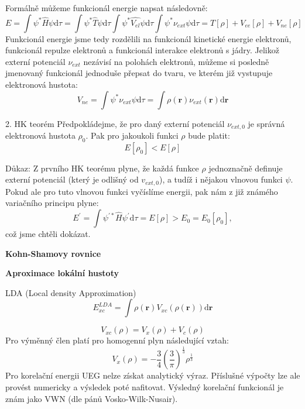 Formálně můžeme funkcionál energie napsat následovně:
\begin{equation}
E=\int \psi^*\hat{H}\psi \mathrm{d}\tau = \int \psi^*\hat{T}\psi\mathrm{d}\tau \int \psi^*\hat{V_{el}}\psi\mathrm{d}\tau \int \psi^*\nu_{ext}\psi\mathrm{d}\tau=T[\rho]+V_{ee}[\rho]+V_{ne}[\rho]
\end{equation}
Funkcionál energie jsme tedy rozdělili na funkcionál kinetické energie elektronů, funkcionál repulze elektronů a funkcionál interakce elektronů s jádry. Jelikož externí potenciál $\nu_{ext}$ nezávisí na polohách elektronů, můžeme si posledně jmenovaný funkcionál jednoduše přepsat do tvaru, ve kterém již vystupuje elektronová hustota:
\begin{equation}
V_{ne}=\int \psi^*\nu_{ext}\psi\mathrm{d}\tau = \int \rho(\textbf{r})\nu_{ext}(\textbf{r}) \mathrm{d}\textbf{r} 
\end{equation} 


2. HK teorém 
Předpokládejme, že pro daný externí potenciál $\nu_{ext,0}$ je správná elektronová hustota $\rho_0$. Pak pro jakoukoli funkci $\rho$ bude platit: $$ E[\rho_0] < E[\rho] $$

Důkaz:
Z prvního HK teorému plyne, že každá funkce $\rho$ jednoznačně definuje externí potenciál (který je odlišný od $v_{ext,0}$), a tudíž i nějakou vlnovou funkci $\psi$. Pokud ale pro tuto vlnovou funkci vyčíslíme energii, pak nám z již známého variačního principu plyne:
\begin{equation}
E^\prime=\int \psi^{\prime *} \hat{H} \psi^{\prime} \mathrm{d}\tau = E[\rho] > E_0 = E_0 [\rho_0] ,
\end{equation}
což jsme chtěli dokázat.

\textbf{Kohn-Shamovy rovnice}


\textbf{Aproximace lokální hustoty}

LDA (Local density Approximation)
\begin{equation}
E_{xc}^{LDA}=\int \rho(\textbf{r})V_{xc}(\rho(\textbf{r}))\mathrm{d}\textbf{r} 
\end{equation}


\begin{equation}
V_{xc}(\rho)=V_x(\rho)+V_c(\rho)
\end{equation}
Pro výměnný člen platí pro homogenní plyn následující vztah:
\begin{equation}
V_x(\rho)=-\frac{3}{4}\left(\frac{3}{\pi}\right)^{\frac{1}{3}}\rho^{\frac{1}{3}}
\end{equation}
Pro korelační energii UEG nelze získat analytický výraz. Příslušné výpočty lze ale provést numericky a výsledek poté nafitovat. Výsledný korelační funkcionál je znám jako VWN (dle pánů Vosko-Wilk-Nusair).


